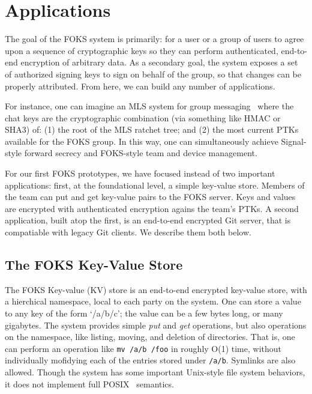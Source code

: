 
\section{Applications}
\label{sec:apps}

The goal of the FOKS system is primarily: for a user or a group of users to
agree upon a sequence of cryptographic keys so they can perform authenticated,
end-to-end encryption of arbitrary data. As a secondary goal, the system
exposes a set of authorized signing keys to sign on behalf of the group,
so that changes can be properly attributed. From here, we can build
any number of applications. 

For instance, one can imagine an MLS system for group messaging~\cite{MLS} where
the chat keys are the cryptographic combination (via something like HMAC or
SHA3) of: (1) the root of the MLS ratchet tree; and (2) the most current PTKs
available for the FOKS group. In this way, one can simultaneously achieve
Signal-style forward secrecy and FOKS-style team and device management. 

For our first FOKS prototypes, we have focused instead of two important applications:
first, at the foundational level, a simple key-value store. Members of the team
can put and get key-value pairs to the FOKS server. Keys and values are encrypted
with authenticated encryption agains the team's PTKs. A second application, built
atop the first, is an end-to-end encrypted Git server, that is compatiable with
legacy Git clients. We describe them both below.

\subsection{The FOKS Key-Value Store}

The FOKS Key-value (KV) store is an end-to-end encrypted key-value store, with 
a hierchical namespace, local to each party on the system. One can store a value
to any key of the form `/a/b/c'; the value can be a few bytes long, or many gigabytes.
The system provides simple \textit{put} and \textit{get} operations, but also
operations on the namespace, like listing, moving, and deletion of directories. That is,
one can perform an operation like \texttt{mv /a/b /foo} in roughly O(1) time, without
individually mofidying each of the entries stored under \texttt{/a/b}. Symlinks are also 
allowed. Though the system has some important Unix-style file system behaviors,
it does not implement full POSIX~\cite{posix-2017} semantics.

